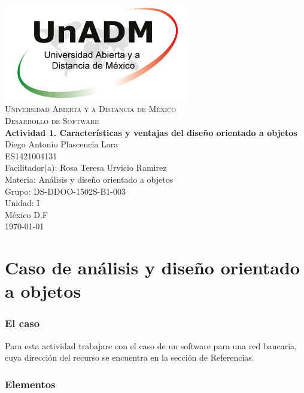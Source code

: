 \documentclass[spanish,12pt,letterpapper]{article}
\begin{document}
	\begin{titlepage}
		\begin{center}
			\includegraphics[width=0.6\textwidth]{./logoUnADM}~\\[1cm] 
			\textsc{Universidad Abierta y a Distancia de México}\\[0.8cm]
			\textsc{Desarrollo de Software}\\[1.8cm]
			
			\textbf{ \Large Actividad 1. Características y ventajas del diseño orientado a objetos }\\[3cm]
			
			Diego Antonio Plascencia Lara\\ ES1421004131 \\[0.4cm]
			Facilitador(a): Rosa Teresa Urvicio Ramirez \\
			Materia: Análisis y diseño orientado a objetos \\
			Grupo: DS-DDOO-1502S-B1-003 \\
			Unidad: I \\
			
			\vfill México D.F\\{\today}
			
		\end{center}
	\end{titlepage}
	
	\part{Caso de análisis y diseño orientado a objetos}
	\section{El caso}
	Para esta actividad trabajare con el caso de un software para una red bancaria, cuya dirección del recurso se encuentra en la sección de Referencias.
	
	\section{Elementos}
\end{document}
